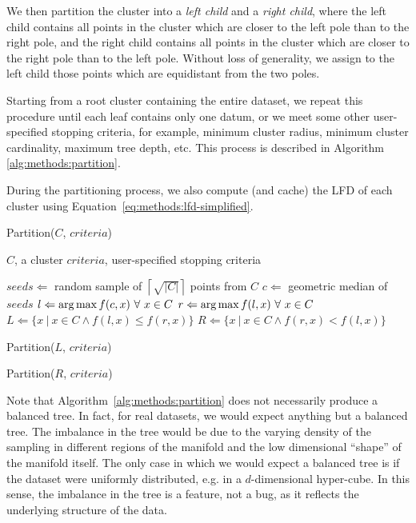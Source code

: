 We then partition the cluster into a \textit{left child} and a \textit{right child}, where the left child contains all points in the cluster which are closer to the left pole than to the right pole, and the right child contains all points in the cluster which are closer to the right pole than to the left pole.
Without loss of generality, we assign to the left child those points which are equidistant from the two poles.

Starting from a root cluster containing the entire dataset, we repeat this procedure until each leaf contains only one datum, or we meet some other user-specified stopping criteria, for example, minimum cluster radius, minimum cluster cardinality, maximum tree depth, etc.
This process is described in Algorithm \ref{alg:methods:partition}.

During the partitioning process, we also compute (and cache) the LFD of each cluster using Equation~\ref{eq:methods:lfd-simplified}.

\begin{algorithm} %
    \caption{Partition($C$, $criteria$)} %
    \label{alg:methods:partition} %
    \begin{algorithmic} %
        \REQUIRE $C$, a cluster
        \REQUIRE $criteria$, user-specified stopping criteria

        \STATE $seeds \Leftarrow$ random sample of $\left\lceil \sqrt{|C|} \right\rceil$ points from $C$
        \STATE $c \Leftarrow$ geometric median of $seeds$
        \STATE $l \Leftarrow \operatorname*{arg\,max} f(c, x) \ \forall \ x \in C$
        \STATE $r \Leftarrow \argmax f(l, x) \ \forall \ x \in C$
        \STATE $L \Leftarrow \{x \ | \ x \in C \land f(l, x) \le f(r, x)\}$
        \STATE $R \Leftarrow \{x \ | \ x \in C \land f(r, x) < f(l, x)\}$
        
            \STATE Partition($L$, $criteria$)
        \ENDIF
        
            \STATE Partition($R$, $criteria$)
        \ENDIF
    \end{algorithmic}
\end{algorithm}

Note that Algorithm~\ref{alg:methods:partition} does not necessarily produce a balanced tree.
In fact, for real datasets, we would expect anything but a balanced tree.
The imbalance in the tree would be due to the varying density of the sampling in different regions of the manifold and the low dimensional ``shape'' of the manifold itself.
The only case in which we would expect a balanced tree is if the dataset were uniformly distributed, e.g. in a $d$-dimensional hyper-cube.
In this sense, the imbalance in the tree is a feature, not a bug, as it reflects the underlying structure of the data.


